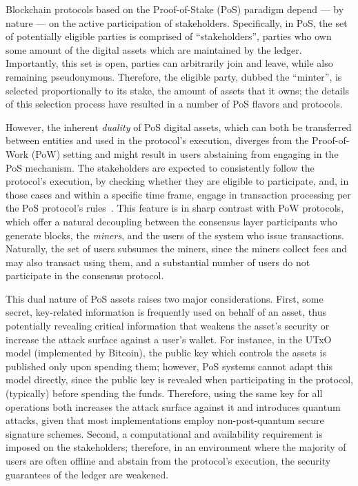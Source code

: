 Blockchain protocols based on the Proof-of-Stake (PoS) paradigm depend --- by
nature --- on the active participation of stakeholders.  Specifically, in PoS,
the set of potentially eligible parties is comprised of ``stakeholders'', \ie
parties who own some amount of the digital assets which are maintained by the
ledger.  Importantly, this set is open, \ie parties can arbitrarily join and
leave, while also remaining pseudonymous.  Therefore, the eligible party,
dubbed the ``minter'', is selected proportionally to its stake, \ie the amount
of assets that it owns; the details of this selection process have resulted in
a number of PoS flavors and protocols.

However, the inherent {\em duality} of PoS digital assets, which can both be
transferred between entities and used in the protocol's execution, diverges
from the Proof-of-Work (PoW) setting and might result in users abstaining from
engaging in the PoS mechanism.  The stakeholders are expected to consistently
follow the protocol's execution, by checking whether they are eligible to
participate, and, in those cases and within a specific time frame, engage in
transaction processing per the PoS protocol's rules~\cite{C:KRDO17,EPRINT:CGMV18,EPRINT:GHMVZ17,vasin2014blackcoin}. This
feature is in sharp contrast with PoW protocols, which offer a natural
decoupling between the consensus layer participants who generate blocks, \ie
the \emph{miners}, and the users of the system who issue transactions.
Naturally, the set of users subsumes the miners, since \eg the miners collect
fees and may also transact using them, and a substantial number of users do not
participate in the consensus protocol.

This dual nature of PoS assets raises two major considerations. First, some
secret, key-related information is frequently used on behalf of an asset, thus
potentially revealing critical information that weakens the asset's security or
increase the attack surface against a user's wallet. For instance, in the UTxO
model (implemented by Bitcoin), the public key which controls the assets is
published only upon spending them; however, PoS systems cannot adapt this model
directly, since the public key is revealed when participating in the protocol,
\ie (typically) before spending the funds. Therefore, using the same key for
all operations both increases the attack surface against it and introduces
quantum attacks, given that most implementations employ non-post-quantum secure
signature schemes.  Second, a computational and availability requirement is
imposed on the stakeholders; therefore, in an environment where the majority of
users are often offline and abstain from the protocol's execution, the security
guarantees of the ledger are weakened.

